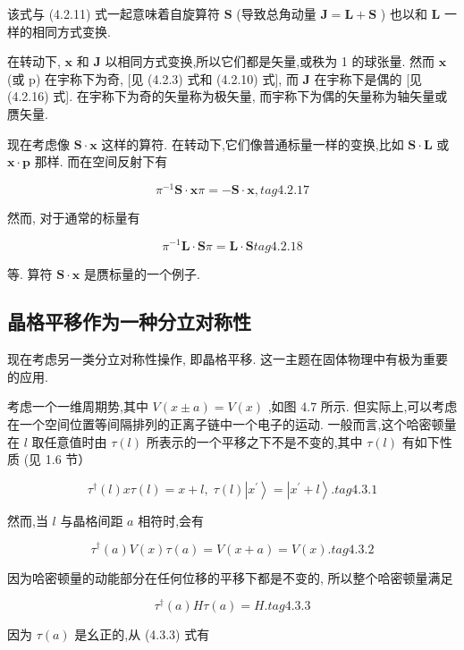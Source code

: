 该式与 (4.2.11) 式一起意味着自旋算符 $\mathbf{S}$ (导致总角动量 $\mathbf{J} = \mathbf{L} + \mathbf{S}$ ) 也以和 $\mathbf{L}$ 一样的相同方式变换.

在转动下, $\mathbf{x}$ 和 $\mathbf{J}$ 以相同方式变换,所以它们都是矢量,或秩为 1 的球张量. 然而 $\mathbf{x}$ (或 p) 在宇称下为奇, [见 (4.2.3) 式和 (4.2.10) 式], 而 $\mathbf{J}$ 在宇称下是偶的 [见 (4.2.16) 式]. 在宇称下为奇的矢量称为极矢量, 而宇称下为偶的矢量称为轴矢量或赝矢量.

现在考虑像 $\mathbf{S} \cdot \mathbf{x}$ 这样的算符. 在转动下,它们像普通标量一样的变换,比如 $\mathbf{S} \cdot \mathbf{L}$ 或 $\mathbf{x} \cdot \mathbf{p}$ 那样. 而在空间反射下有

$$
{\pi }^{-1}\mathbf{S} \cdot \mathbf{x}\pi = - \mathbf{S} \cdot \mathbf{x}, tag{4.2.17}
$$

然而, 对于通常的标量有

$$
{\pi }^{-1}\mathbf{L} \cdot \mathbf{S}\pi = \mathbf{L} \cdot \mathbf{S} tag{4.2.18}
$$

等. 算符 $\mathbf{S} \cdot \mathbf{x}$ 是赝标量的一个例子.

\subsection{晶格平移作为一种分立对称性}
现在考虑另一类分立对称性操作, 即晶格平移. 这一主题在固体物理中有极为重要的应用.

考虑一个一维周期势,其中 $V\left( {x \pm a}\right) = V\left( x\right)$ ,如图 4.7 所示. 但实际上,可以考虑在一个空间位置等间隔排列的正离子链中一个电子的运动. 一般而言,这个哈密顿量在 $l$ 取任意值时由 $\tau \left( l\right)$ 所表示的一个平移之下不是不变的,其中 $\tau \left( l\right)$ 有如下性质 (见 1.6 节）

$$
{\tau }^{ \dagger }\left( l\right) {x\tau }\left( l\right) = x + l,\;\tau \left( l\right) \left| {x}^{\prime }\right\rangle = \left| {{x}^{\prime } + l}\right\rangle . tag{4.3.1}
$$

然而,当 $l$ 与晶格间距 $a$ 相符时,会有

$$
{\tau }^{ \dagger }\left( a\right) V\left( x\right) \tau \left( a\right) = V\left( {x + a}\right) = V\left( x\right) . tag{4.3.2}
$$

因为哈密顿量的动能部分在任何位移的平移下都是不变的, 所以整个哈密顿量满足

$$
{\tau }^{ \dagger }\left( a\right) {H\tau }\left( a\right) = H. tag{4.3.3}
$$

因为 $\tau \left( a\right)$ 是幺正的,从 (4.3.3) 式有

